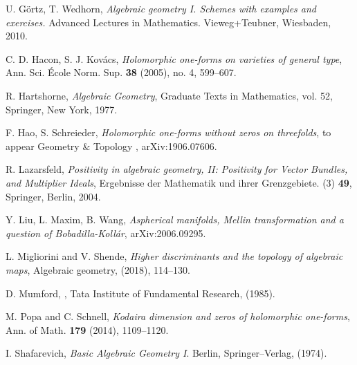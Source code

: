 \documentclass[a4paper,12pt,reqno]{amsart}
\theoremstyle{plain}
\theoremstyle{remark}
\begin{document}
\begin{thebibliography}{HKLR}
 U. G\"ortz, T. Wedhorn, \textit{Algebraic geometry I. Schemes with examples and exercises.} Advanced Lectures in Mathematics. Vieweg+Teubner, Wiesbaden, 2010. 

 C. D. Hacon, S. J. Kov\'acs, \textit{Holomorphic one-forms on varieties of general type}, Ann. Sci. \'Ecole Norm. Sup. \textbf{38} (2005), no. 4, 599--607.

 R. Hartshorne, \textit{Algebraic Geometry}, Graduate Texts in Mathematics, vol. 52, Springer, New York,
1977.

 F. Hao, S. Schreieder, \textit{Holomorphic one-forms without zeros on threefolds}, to appear Geometry $\&$ Topology , arXiv:1906.07606.


 R. Lazarsfeld, \textit{Positivity in algebraic geometry, II: Positivity for Vector Bundles, and Multiplier Ideals}, Ergebnisse der Mathematik und ihrer Grenzgebiete. (3) \textbf{49}, Springer, Berlin, 2004.





 Y. Liu, L. Maxim, B. Wang, \textit{Aspherical manifolds, Mellin transformation and a question of Bobadilla-Koll\'ar}, arXiv:2006.09295.

 L. Migliorini and V. Shende, \textit{Higher discriminants and the topology of algebraic maps}, Algebraic geometry, (2018), 114--130.

 D. Mumford, , Tata Institute of Fundamental Research, (1985).

 M. Popa and C. Schnell, \textit{Kodaira dimension and zeros of holomorphic one-forms}, Ann. of Math. \textbf{179} (2014), 1109--1120.


 I. Shafarevich, \textit{Basic Algebraic Geometry I}. Berlin, Springer--Verlag, (1974).


\end{thebibliography}
\end{document}
